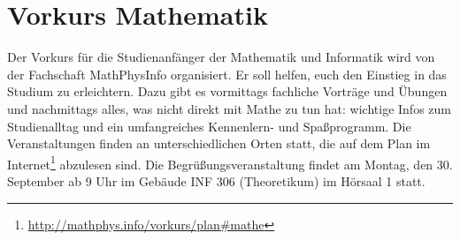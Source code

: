 \section{Vorkurs Mathematik}
Der Vorkurs für die Studienanfänger der Mathematik und Informatik wird von der Fachschaft MathPhysInfo organisiert. Er soll helfen, euch den Einstieg in das Studium zu erleichtern. Dazu gibt es vormittags fachliche Vorträge und Übungen und nachmittags alles, was nicht direkt mit Mathe zu tun hat: wichtige Infos zum Studienalltag und ein umfangreiches Kennenlern- und Spaßprogramm.
Die Veranstaltungen finden an unterschiedlichen Orten statt, die auf dem Plan im Internet\footnote{\url{http://mathphys.info/vorkurs/plan\#mathe}} abzulesen sind. Die Begrüßungsveranstaltung findet am Montag, den 30. September ab 9 Uhr im Gebäude \gls{INF} 306 (Theoretikum) im Hörsaal 1 statt.
